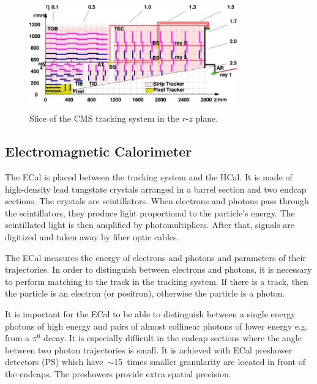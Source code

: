 \begin{figure}[htb]
  \begin{center}
    {\includegraphics[width=0.8\textwidth]{../figs/Exp/tracker_slice.png}}
    \caption{Slice of the CMS tracking system in the $r$-$z$ plane.}
    \label{fig:tracker_slice}
  \end{center}
\end{figure}

\subsection{Electromagnetic Calorimeter}

The ECal is placed between the tracking system and the HCal. It is made of high-density lead tungstate crystals arranged in a barrel section and two endcap sections. The crystals are scintillators. When electrons and photons pass through the scintillators, they produce light proportional to the particle's energy. The scintillated light is then amplified by photomultipliers. After that, signals are digitized and taken away by fiber optic cables.

The ECal measures the energy of electrons and photons and parameters of their trajectories. In order to distinguish between electrons and photons, it is necessary to perform matching to the track in the tracking system. If there is a track, then the particle is an electron (or positron), otherwise the particle is a photon.

It is important for the ECal to be able to distinguish between a single energy photons of high energy and pairs of almost collinear photons of lower energy e.g. from a $\pi^0$ decay. It is especially difficult in the endcap sections where the angle between two photon trajectories is small. It is achieved with ECal preshower detectors (PS) which have~$\sim$15~times smaller granularity are located in front of the endcaps. The preshowers provide extra spatial precision. 


